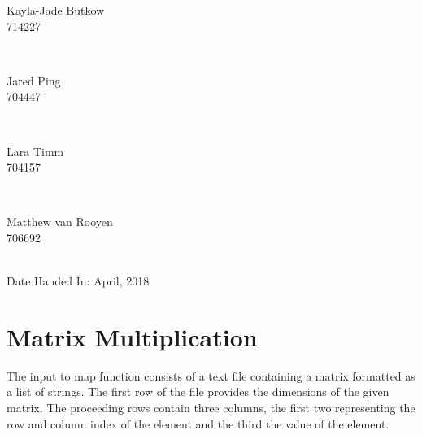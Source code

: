 \documentclass[10pt,twocolumn]{witseiepaper}
\begin{document}
\begin{titlepage}
		
		\begin{minipage}{0.4\textwidth}
			\begin{flushleft} \large
				Kayla-Jade Butkow \\ 714227 %
			\end{flushleft}
		\end{minipage}
		~
		\begin{minipage}{0.4\textwidth}
			\begin{flushright} \large
				Jared Ping \\ 704447
			\end{flushright}
		\end{minipage}\\[1cm]
		
		\begin{minipage}{0.4\textwidth}
			\begin{flushleft} \large
				Lara Timm \\ 704157
			\end{flushleft}
		\end{minipage}
		~
		\begin{minipage}{0.4\textwidth}
			\begin{flushright} \large
				Matthew van Rooyen \\ 706692
			\end{flushright}
		\end{minipage}\\[1cm]
		
		
		
		{\large Date Handed In:  April, 2018}\\[1cm] 
		
	\end{titlepage}


\pagestyle{plain}
\setcounter{page}{1}
\onecolumn
%
\section{Matrix Multiplication}

The input to map function consists of a text file containing a matrix formatted as a list of strings. The first row of the file provides the dimensions of the given matrix. The proceeding rows contain three columns, the first two representing the row and column index of the element and the third the value of the element.
\end{document}
